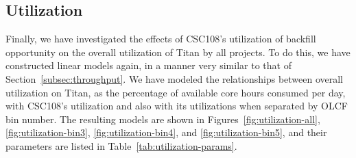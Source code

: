 

\subsection{Utilization}
\label{subsec:utilization}

Finally, we have investigated the effects of CSC108's utilization of backfill
opportunity on the overall utilization of Titan by all projects. To do this, we
have constructed linear models again, in a manner very similar to that of
Section~\ref{subsec:throughput}. We have modeled the relationships between
overall utilization on Titan, as the percentage of available core hours
consumed per day, with CSC108's utilization and also with its utilizations when
separated by OLCF bin number. The resulting models are shown in
Figures~\ref{fig:utilization-all}, \ref{fig:utilization-bin3},
\ref{fig:utilization-bin4}, and \ref{fig:utilization-bin5}, and their
parameters are listed in Table~\ref{tab:utilization-params}.



